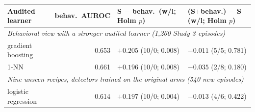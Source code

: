 \begin{tabular}{lrll}
\toprule
Audited learner & behav.\ AUROC & S $-$ behav.\ (w/l; Holm $p$) & (S$+$behav.) $-$ S (w/l; Holm $p$)\\
\midrule
\multicolumn{4}{l}{\emph{Behavioral view with a stronger audited learner (1,260 Study-3 episodes)}}\\
gradient boosting & 0.653 & $+0.205$ (10/0; 0.008) & $-0.011$ (5/5; 0.781)\\
1-NN & 0.661 & $+0.196$ (10/0; 0.008) & $-0.035$ (2/8; 0.180)\\
\midrule
\multicolumn{4}{l}{\emph{Nine unseen recipes, detectors trained on the original arms (540 new episodes)}}\\
logistic regression & 0.614 & $+0.197$ (10/0; 0.004) & $-0.013$ (4/6; 0.422)\\
\bottomrule
\end{tabular}
